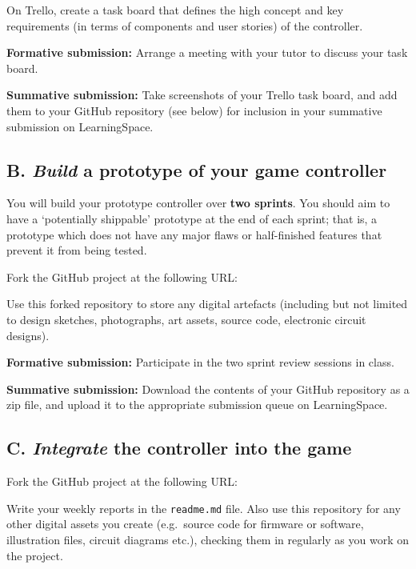 \documentclass{../fal_assignment}
\begin{document}
On Trello, create a task board that defines the high concept and key requirements
(in terms of components and user stories) of the controller.

\textbf{Formative submission:} Arrange a meeting with your tutor to discuss your task board.

\textbf{Summative submission:} Take screenshots of your Trello task board,
    and add them to your GitHub repository (see below) for inclusion in your summative submission on LearningSpace.

\subsection*{B. \emph{Build} a prototype of your game controller}

You will build your prototype controller over \textbf{two sprints}.
You should aim to have a `potentially shippable' prototype at the end of each sprint;
that is, a prototype which does not have any major flaws or half-finished features that prevent it from being tested.

Fork the GitHub project at the following URL:


Use this forked repository to store any digital artefacts (including but not limited to
design sketches, photographs, art assets, source code, electronic circuit designs).

\textbf{Formative submission:} Participate in the two sprint review sessions in class.

\textbf{Summative submission:} Download the contents of your GitHub repository as a zip file,
    and upload it to the appropriate submission queue on LearningSpace.

\subsection*{C. \emph{Integrate} the controller into the game}





Fork the GitHub project at the following URL:


Write your weekly reports in the \texttt{readme.md} file.
Also use this repository for any other digital assets you create
(e.g.\ source code for firmware or software, illustration files, circuit diagrams etc.),
checking them in regularly as you work on the project.
\end{document}
